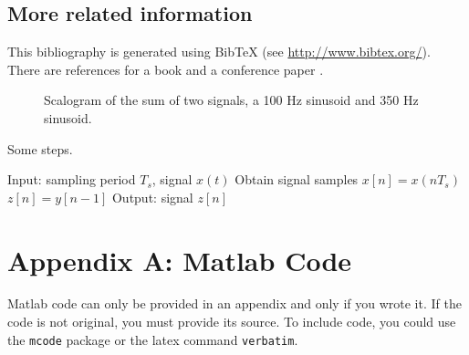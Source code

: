 \documentclass[11pt]{article}
\begin{document}
\subsection{More related information}

This bibliography is generated using  {\sc BibTeX}  
 (see \url{http://www.bibtex.org/}).  There are references for 
 a book   \cite{The20} and a  conference paper  \cite{Veg14}.


\begin{figure}[t]
\begin{center}
\end{center}
\caption{Scalogram of the sum of  two signals,  a 100 Hz sinusoid 
and  350 Hz  sinusoid.}
\label{fig}
\end{figure}

\begin{algorithm}[h] 
\caption{Some steps.}
\begin{algorithmic}
%
\STATE Input: sampling period $T_s$, signal $x(t)$ 
\STATE Obtain signal samples  $x[n]=x(n  T_s)$        
%
\STATE  $z[n]=y[n-1]$
\ENDFOR
\STATE Output: signal $z[n]$
%
\end{algorithmic}
\label{alg1}
\end{algorithm}

\begin{singlespace}
 \titlespacing{\section}{0pt}{12pt}{12pt}
 


\end{singlespace}

\section*{Appendix A: Matlab Code}

  {\sc Matlab} code can only be provided in an appendix and only if you wrote it.
If the code is not original,  you must provide its source.
To include code, you could use the   {\tt mcode} package or  the latex command {\tt verbatim}.
\end{document}
